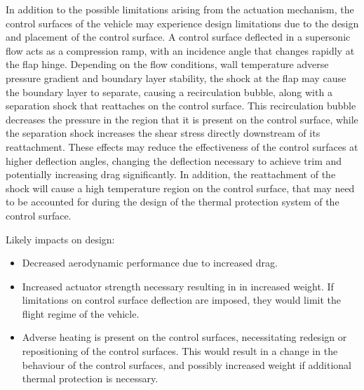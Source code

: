 In addition to the possible limitations arising from the actuation mechanism, the control surfaces of the vehicle may experience design limitations due to the design and placement of the control surface.
A control surface deflected in a supersonic flow acts as a compression ramp, with an incidence angle that changes rapidly at the flap hinge. Depending on the flow conditions, wall temperature adverse pressure gradient and boundary layer stability, the shock at the flap may cause the boundary layer to separate, causing a recirculation bubble, along with a separation shock that reattaches on the control surface\cite{Marini2001}. This recirculation bubble decreases the pressure in the region that it is present on the control surface, while the separation shock increases the shear stress directly downstream of its reattachment\cite{Marini2001}. These effects may reduce the effectiveness of the control surfaces at higher deflection angles, changing the deflection necessary to achieve trim and potentially increasing drag significantly. In addition, the reattachment of the shock will cause a high temperature region on the control surface, that may need to be accounted for during the design of the thermal protection system of the control surface. 


Likely impacts on design:
\begin{itemize}[noitemsep,topsep=0pt]
	\item Decreased aerodynamic performance due to increased drag.
	\item Increased actuator strength necessary resulting in in increased weight. If limitations on control surface deflection are imposed, they would limit the flight regime of the vehicle. 
	\item Adverse heating is present on the control surfaces, necessitating redesign or repositioning of the control surfaces. This would result in a change in the behaviour of the control surfaces, and possibly increased weight if additional thermal protection is necessary.
\end{itemize}


